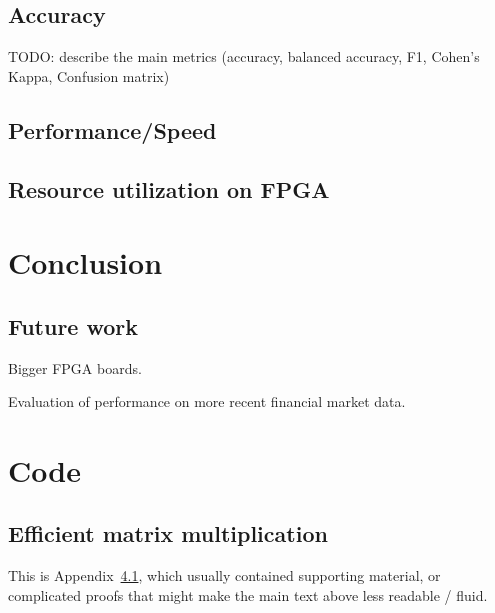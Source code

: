 \documentclass[a4paper, twoside]{report}
\theoremstyle{definition}
\numberwithin{equation}{section}
\begin{document}
\section{Accuracy}

TODO: describe the main metrics (accuracy, balanced accuracy, F1, Cohen's Kappa, Confusion matrix)


\section{Performance/Speed}





\section{Resource utilization on FPGA}



\newpage
\chapter*{Conclusion}

\section{Future work}
Bigger FPGA boards.

Evaluation of performance on more recent financial market data.


\newpage
\appendix
\chapter{Code}
\section{Efficient matrix multiplication}\label{app:Appendix}
This is Appendix~\ref{app:Appendix}, which usually contained supporting material,
or complicated proofs that might make the main text above less readable / fluid.



\end{document}
